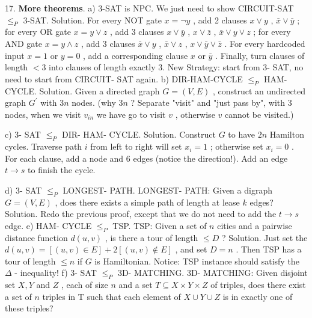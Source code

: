 \documentclass[10pt,a4paper]{article}
\begin{document}
17. \textbf{More theorems}.
a) 3-SAT is NPC. We just need to show CIRCUIT-SAT \(\leq_{P}\) 3-SAT.
Solution. For every NOT gate \(x = \neg y\) , add 2 clauses \(x\vee y\) , \(\bar{x}\vee \bar{y}\) ; for every OR gate \(x = y\vee z\) , add 3 clauses \(x\vee \bar{y}\) , \(x\vee \bar{z}\) , \(\bar{x}\vee y\vee z\) ; for every AND gate \(x = y\wedge z\) , add 3 clauses \(\bar{x}\vee y\) , \(\bar{x}\vee z\) , \(x\vee \bar{y}\vee \bar{z}\) . For every hardcoded input \(x = 1\) or \(y = 0\) , add a corresponding clause \(x\) or \(\bar{y}\) . Finally, turn clauses of length \(< 3\) into clauses of length exactly 3.
New Strategy: start from 3- SAT, no need to start from CIRCUIT- SAT again.
b) DIR-HAM-CYCLE \(\leq_{P}\) HAM- CYCLE.
Solution. Given a directed graph \(G = (V,E)\) , construct an undirected graph \(G^{\prime}\) with \(3n\) nodes. (why \(3n\) ? Separate "visit" and "just pass by", with 3 nodes, when we visit \(v_{in}\) we have go to visit \(v\) , otherwise \(v\) cannot be visited.)
\begin{center}
\end{center}
c) 3- SAT \(\leq_{P}\) DIR- HAM- CYCLE.
Solution. Construct \(G\) to have \(2n\) Hamilton cycles. Traverse path \(i\) from left to right will set \(x_{i} = 1\) ; otherwise set \(x_{i} = 0\) . For each clause, add a node and 6 edges (notice the direction!). Add an edge \(t\rightarrow s\) to finish the cycle.
\begin{center}
\end{center}
d) 3- SAT \(\leq_{P}\) LONGEST- PATH.
LONGEST- PATH: Given a digraph \(G = (V,E)\) , does there exists a simple path of length at lease \(k\) edges?
Solution. Redo the previous proof, except that we do not need to add the \(t\rightarrow s\) edge.
e) HAM- CYCLE \(\leq_{P}\) TSP.
TSP: Given a set of \(n\) cities and a pairwise distance function \(d(u,v)\) , is there a tour of length \(\leq D\) ?
Solution. Just set the \(d(u,v) = [(u,v)\in E] + 2[(u,v)\notin E]\) , and set \(D = n\) . Then TSP has a tour of length \(\leq n\) if \(G\) is Hamiltonian.
Notice: TSP instance should satisfy the \(\Delta\) - inequality!
f) 3- SAT \(\leq_{P}\) 3D- MATCHING.
3D- MATCHING: Given disjoint set \(X,Y\) and \(Z\) , each of size \(n\) and a set \(T\subseteq X\times Y\times Z\) of triples, does there exist a set of \(n\) triples in T such that each element of \(X \cup Y \cup Z\) is in exactly one of these triples?
\end{document}
